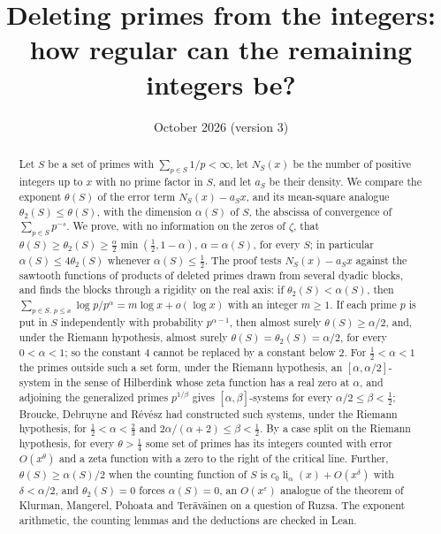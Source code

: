 \documentclass[11pt]{amsart}
\title[Deleting primes from the integers]{Deleting primes from the integers:\\ how regular can the remaining integers be?}
\date{October 2026 (version 3)}
\theoremstyle{remark}
\numberwithin{equation}{section}
\newcommand{\eps}{\varepsilon}
\DeclareMathOperator{\li}{li}
\begin{document}
\begin{abstract}
Let $S$ be a set of primes with $\sum_{p\in S}1/p<\infty$, let $N_S(x)$ be the number of positive integers up to $x$ with no prime factor in $S$, and let $a_S$ be their density. We compare the exponent $\theta(S)$ of the error term $N_S(x)-a_Sx$, and its mean-square analogue $\theta_2(S)\le\theta(S)$, with the dimension $\alpha(S)$ of $S$, the abscissa of convergence of $\sum_{p\in S}p^{-s}$. We prove, with no information on the zeros of $\zeta$, that $\theta(S)\ge\theta_2(S)\ge\tfrac{\alpha}{2}\min(\tfrac12,1-\alpha)$, $\alpha=\alpha(S)$, for every $S$; in particular $\alpha(S)\le4\theta_2(S)$ whenever $\alpha(S)\le\tfrac12$. The proof tests $N_S(x)-a_Sx$ against the sawtooth functions of products of deleted primes drawn from several dyadic blocks, and finds the blocks through a rigidity on the real axis: if $\theta_2(S)<\alpha(S)$, then $\sum_{p\in S,\,p\le x}\log p/p^{\alpha}=m\log x+o(\log x)$ with an integer $m\ge1$. If each prime $p$ is put in $S$ independently with probability $p^{\alpha-1}$, then almost surely $\theta(S)\ge\alpha/2$, and, under the Riemann hypothesis, almost surely $\theta(S)=\theta_2(S)=\alpha/2$, for every $0<\alpha<1$; so the constant $4$ cannot be replaced by a constant below $2$. For $\tfrac12<\alpha<1$ the primes outside such a set form, under the Riemann hypothesis, an $[\alpha,\alpha/2]$-system in the sense of Hilberdink whose zeta function has a real zero at $\alpha$, and adjoining the generalized primes $p^{1/\beta}$ gives $[\alpha,\beta]$-systems for every $\alpha/2\le\beta<\tfrac12$; Broucke, Debruyne and R\'ev\'esz had constructed such systems, under the Riemann hypothesis, for $\tfrac12<\alpha<\tfrac23$ and $2\alpha/(\alpha+2)\le\beta<\tfrac12$. By a case split on the Riemann hypothesis, for every $\theta>\tfrac14$ some set of primes has its integers counted with error $O(x^{\theta})$ and a zeta function with a zero to the right of the critical line. Further, $\theta(S)\ge\alpha(S)/2$ when the counting function of $S$ is $c_0\li_\alpha(x)+O(x^{\delta})$ with $\delta<\alpha/2$, and $\theta_2(S)=0$ forces $\alpha(S)=0$, an $O(x^{\eps})$ analogue of the theorem of Klurman, Mangerel, Pohoata and Ter\"av\"ainen on a question of Ruzsa. The exponent arithmetic, the counting lemmas and the deductions are checked in Lean.
\end{abstract}

\maketitle
\end{document}
